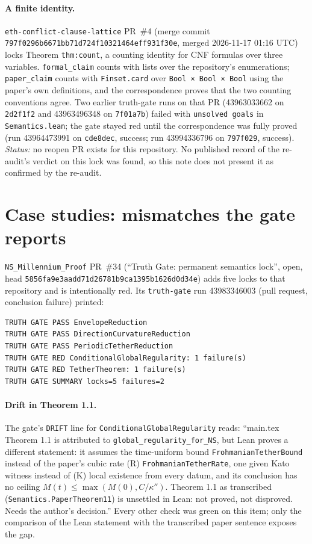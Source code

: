 \documentclass[11pt,a4paper]{article}
\newcommand{\code}[1]{\texttt{#1}}
\begin{document}
\paragraph{A finite identity.} \code{eth-conflict-clause-lattice} PR~\#4 (merge commit
\code{797f0296b6671bb71d724f10321464eff931f30e}, merged 2026-11-17 01:16 UTC) locks
Theorem \code{thm:count}, a counting identity for CNF formulas over three variables.
\code{formal\_claim} counts with lists over the repository's enumerations; \code{paper\_claim}
counts with \code{Finset.card} over \code{Bool × Bool × Bool} using the paper's own definitions,
and the correspondence proves that the two counting conventions agree. Two earlier truth-gate
runs on that PR (43963033662 on \code{2d2f1f2} and 43963496348 on \code{7f01a7b}) failed with
\code{unsolved goals} in \code{Semantics.lean}; the gate stayed red until the correspondence was
fully proved (run 43964473991 on \code{cde8dec}, success; run 43994336796 on \code{797f029},
success). \emph{Status:} no reopen PR exists for this repository. No published record of the
re-audit's verdict on this lock was found, so this note does not present it as confirmed by the
re-audit.

\section{Case studies: mismatches the gate reports}

\code{NS\_Millennium\_Proof} PR~\#34 (``Truth Gate: permanent semantics lock'', open, head
\code{5856fa9e3aadd71d26781b9ca1395b1626d0d34e}) adds five locks to that repository and is
intentionally red. Its \code{truth-gate} run 43983346003 (pull request, conclusion failure)
printed:
\begin{Verbatim}
TRUTH GATE PASS EnvelopeReduction
TRUTH GATE PASS DirectionCurvatureReduction
TRUTH GATE PASS PeriodicTetherReduction
TRUTH GATE RED ConditionalGlobalRegularity: 1 failure(s)
TRUTH GATE RED TetherTheorem: 1 failure(s)
TRUTH GATE SUMMARY locks=5 failures=2
\end{Verbatim}

\paragraph{Drift in Theorem 1.1.} The gate's \code{DRIFT} line for
\code{ConditionalGlobalRegularity} reads: ``main.tex Theorem 1.1 is attributed to
\code{global\_regularity\_for\_NS}, but Lean proves a different statement: it assumes the
time-uniform bound \code{FrohmanianTetherBound} instead of the paper's cubic rate (R)
\code{FrohmanianTetherRate}, one given Kato witness instead of (K) local existence from every
datum, and its conclusion has no ceiling $M(t)\le\max(M(0),C/\kappa'')$. Theorem 1.1 as
transcribed (\code{Semantics.PaperTheorem11}) is unsettled in Lean: not proved, not disproved.
Needs the author's decision.'' Every other check was green on this item; only the
comparison of the Lean statement with the transcribed paper sentence exposes the gap.
\end{document}
